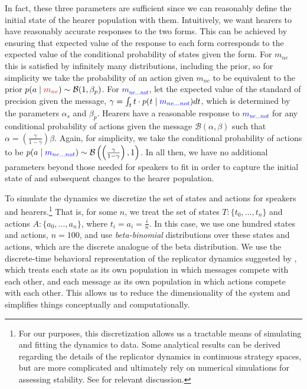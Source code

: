 \documentclass[linguex]{sp}
\theoremstyle{definition} \newtheorem{definition}{Definition}
\begin{document}
In fact, these three parameters are sufficient since we can reasonably define the initial state of the hearer population with them. Intuitively, we want hearers to have reasonably accurate responses to the two forms. This can be achieved by ensuring that expected value of the response to each form corresponds to the expected value of the conditional probability of states given the form.  For \textit{\color{red} $m_{ne}$} this is satisfied by infinitely many distributions, including the prior, so for simplicity we take the probability of an action given \textit{\color{red} $m_{ne}$}  to  be equivalent to the prior $p(a \mid \textit{\color{red} $m_{ne}$}) \sim \mathcal B (1, \beta_p)$. For \textcolor{blue}{$m_{ne...not}$}, let the expected value of the standard of precision given the message, $\gamma = \int_t t \cdot p(t \mid \textcolor{blue}{m_{ne...not}} ) dt$, which is determined by the parameters $\alpha_s$ and $\beta_p$. Hearers have a reasonable response to \textcolor{blue}{$m_{ne...not}$} for any conditional probability of actions given the message $\mathcal{B}(\alpha, \beta)$ such that $\alpha = \left( \frac{\gamma}{1 - \gamma} \right)\beta$. Again, for simplicity, we take the conditional probability of actions to be $p(a \mid \textcolor{blue}{m_{ne...not}}) \sim \mathcal{B}\left(\left( \frac{\gamma}{1 - \gamma} \right), 1\right)$. In all then, we have no additional parameters beyond those needed for speakers to fit in order to capture the initial state of and subsequent changes to the hearer population.

To simulate the dynamics we discretize the set of states and actions for speakers and hearers.\footnote{For our purposes, this discretization allows us a tractable means of simulating and fitting the dynamics to data. Some analytical results can be derived regarding the  details of the replicator dynamics in continuous strategy spaces, but are more complicated  and ultimately rely on numerical simulations for assessing stability. See  \cite{oechssler2001,oechssler2002,jager2011} for relevant discussion.} That is, for some $n$, we treat the set of states $T : \{t_0, ..., t_n \}$ and actions $A : \{a_0, ..., a_n \}$, where $t_i = a_i = \frac{i}{n}$. In this case, we use one hundred states and actions, $n=100$, and use \emph{beta-binomial} distributions over these states and actions, which are the discrete analogue of the beta distribution. We use the discrete-time behavioral representation of the replicator dynamics suggested by \cite{hofbauer-huttegger2015}, which treats each state as its own population in which messages compete with each other, and each message as its own population in which actions compete with each other. This allows us to reduce the dimensionality of the system and simplifies things conceptually and computationally.  
\end{document}
